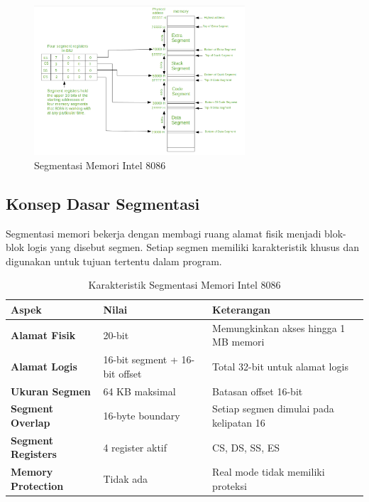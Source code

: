 \documentclass[../main.tex]{subfiles}
\begin{document}
        \begin{figure}[H]
            \centering
            \includegraphics[width=0.7\textwidth]{../images/8086_memory_segmentation.png}
            \caption{Segmentasi Memori Intel 8086}
            \label{fig:8086-memory-segmentation}
        \end{figure}

        \subsection{Konsep Dasar Segmentasi}
            Segmentasi memori bekerja dengan membagi ruang alamat fisik menjadi blok-blok logis yang disebut segmen. Setiap segmen memiliki karakteristik khusus dan digunakan untuk tujuan tertentu dalam program.

            \begin{table}[H]
\centering
\caption{Karakteristik Segmentasi Memori Intel 8086}
\begin{tabular}{|p{3.2cm}|p{3.8cm}|p{7cm}|}
    \hline
    \textbf{Aspek} & \textbf{Nilai} & \textbf{Keterangan} \\
    \hline
    \textbf{Alamat Fisik} & 20-bit & Memungkinkan akses hingga 1 MB memori \\
    \hline
    \textbf{Alamat Logis} & 16-bit segment + 16-bit offset & Total 32-bit untuk alamat logis \\
    \hline
    \textbf{Ukuran Segmen} & 64 KB maksimal & Batasan offset 16-bit \\
    \hline
    \textbf{Segment Overlap} & 16-byte boundary & Setiap segmen dimulai pada kelipatan 16 \\
    \hline
    \textbf{Segment Registers} & 4 register aktif & CS, DS, SS, ES \\
    \hline
    \textbf{Memory Protection} & Tidak ada & Real mode tidak memiliki proteksi \\
    \hline
\end{tabular}
\label{tab:memory-segmentation-characteristics}
            \end{table}
\end{document}

